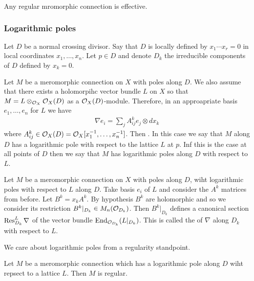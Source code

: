 Any regular mromorphic connection is effective.

\subsubsection{Logarithmic poles}
Let $D$ be a normal crossing divisor. Say that $D$ is locally defined
by $x_1\cdots x_r = 0$ in local coordinates $x_1,\dots,x_n$. Let $p\in D$
and denote $D_k$ the irreducible components of $D$ defined by $x_k = 0$.

\hfill

Let $M$ be a meromorphic connection on $X$ with poles along $D$.
We also assume that there exists a holomorpihc vector bundle $L$ on $X$ so that
$M = L\otimes_{{\mathcal{O}}_X} {\mathcal{O}}_X(D)$ as a ${\mathcal{O}}_X(D)$-module. Therefore, in an approapriate
basis $e_1,\dots,e_n$ for $L$ we have \begin{align*}
	\nabla e_i = \sum_j A^k_{ij}e_j \otimes dx_k
\end{align*}
where $A^k_{ij} \in {\mathcal{O}}_X(D) = {\mathcal{O}}_X[x_1^{-1},\dots,x_n^{-1}]$. Then . In this case
we say that $M$ along $D$ has a logarithmic pole with respect to the lattice $L$ at $p$.
Inf this is the case at all points of $D$ then we say that $M$ has logarithmic poles along $D$
with respect to $L$.

\hfill

Let $M$ be a meromorphic connection on $X$ with poles along $D$, wiht logarithmic poles
with respect to $L$ along $D$. Take basis $e_i$ of $L$ and consider the $A^k$ matrices from before. Let $B^k = x_k A^k$.
By hypothesis $B^k$ are holomorphic and so we consider its restriction $B^k\vert_{D_k} \in M_n({\mathcal{O}}_{D_k})$.
Then $B^k\vert_{D_k}$ defines a canonical section $\operatorname{Res}^L_{D_k}\nabla$ of the vector bundle $\operatorname{End}_{{\mathcal{O}}_{D_k}}(L\vert_{D_k})$.
This is called the  of $\nabla$ along $D_k$ with respect to $L$.

\hfill

We care about logarithmic poles from a regularity standpoint.

\begin{proposition}
	Let $M$ be a meromorphic connection which has a logarithmic pole along $D$ wiht
	repsect to a lattice $L$. Then $M$ is regular.
\end{proposition}

